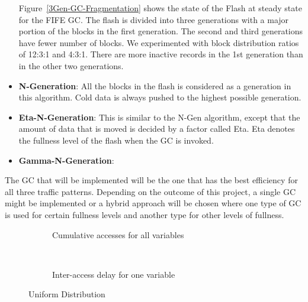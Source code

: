 \begin{itemize}
Figure~\ref{3Gen-GC-Fragmentation} shows the state of the Flash at steady state for the FIFE GC. The flash is divided into three generations with a major portion of the blocks in the first generation. The second and third generations have fewer number of blocks. We experimented with block distribution ratios of 12:3:1 and 4:3:1. There are more inactive records in the 1st generation than in the other two generations.

\item {\bf N-Generation}:
All the blocks in the flash is considered as a generation in this algorithm. Cold data is always pushed to the highest possible generation.
\item {\bf Eta-N-Generation}:
This is similar to the N-Gen algorithm, except that the amount of data that is moved is decided by a factor called Eta. Eta denotes the fullness level of the flash when the GC is invoked.
\item {\bf Gamma-N-Generation}:
\end{itemize}	

The GC that will be implemented will be the one that has the best efficiency for all three traffic patterns. Depending on the outcome of this project, a single GC might be implemented or a hybrid approach will be chosen where one type of GC is used for certain fullness levels and another type for other levels of fullness.

\begin{figure}
        \centering
        \begin{subfigure}[b]{0.4\textwidth}
                \centering
                \caption{Cumulative accesses for all variables} \label{Uniform-cumul}
        \end{subfigure}
         ~~~ %
        \begin{subfigure}[b]{0.4\textwidth}
                \centering
                \caption{Inter-access delay for one variable} \label{Uniform-IAD}
        \end{subfigure}
        \caption{Uniform Distribution}
\end{figure}

